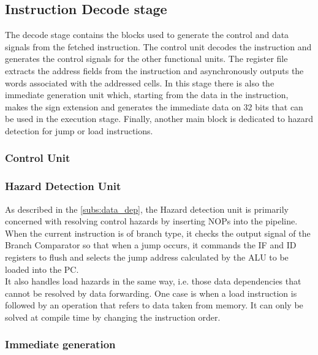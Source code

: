 \subsection{Instruction Decode stage}
The decode stage contains the blocks used to generate the control and data signals from the fetched instruction. The control unit decodes the instruction and generates the control signals for the other functional units. The register file extracts the address fields from the instruction and asynchronously outputs the words associated with the addressed cells. In this stage there is also the immediate generation unit which, starting from the data in the instruction, makes the sign extension and generates the immediate data on 32 bits that can be used in the execution stage. Finally, another main block is dedicated to hazard detection for jump or load instructions.

\subsubsection{Control Unit}

\subsubsection{Hazard Detection Unit}
As described in the \autoref{subs:data_dep}, the Hazard detection unit is primarily concerned with resolving control hazards by inserting NOPs into the pipeline. 
When the current instruction is of branch type, it checks the output signal of the Branch Comparator so that when a jump occurs, it commands the IF and ID registers to flush and selects the jump address calculated by the ALU to be loaded into the PC.\\
It also handles load hazards in the same way, i.e. those data dependencies that cannot be resolved by data forwarding. One case is when a load instruction is followed by an operation that refers to data taken from memory. It can only be solved at compile time by changing the instruction order.

\subsubsection{Immediate generation}
